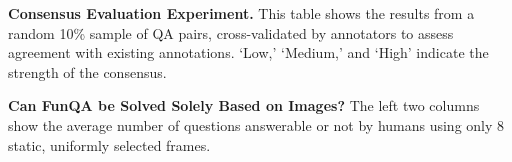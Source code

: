 \begin{center}
\begin{minipage}{\textwidth}
\begin{minipage}[t]{0.48\textwidth}
\makeatletter{}
\caption{\textbf{Consensus Evaluation Experiment.} This table shows the results from a random 10\% sample of QA pairs, cross-validated by annotators to assess agreement with existing annotations. `Low,' `Medium,' and `High' indicate the strength of the consensus.}
\label{T:coneval}
\end{minipage}
\hfill
\begin{minipage}[t]{0.48\textwidth}
\makeatletter{}
\caption{\textbf{Can FunQA be Solved Solely Based on Images?} The left two columns show the average number of questions answerable or not by humans using only 8 static, uniformly selected frames.}
\label{T:onlyframes}
\centering
\end{minipage}
\end{minipage}
\vspace{10pt}
\end{center}
